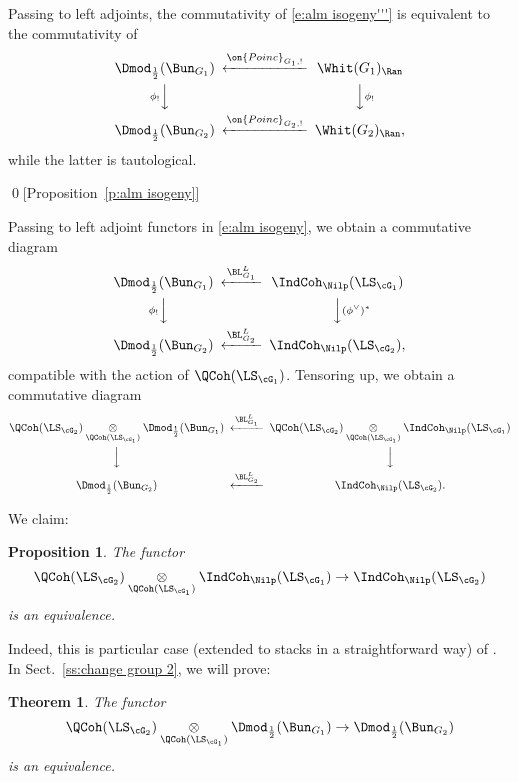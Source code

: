 \documentclass[9pt]{amsart}
\newtheorem{prop}[subsubsection]{Proposition}
\newtheorem{thm}[subsubsection]{Theorem}
\theoremstyle{remark}
\theoremstyle{definition}
\theoremstyle{remark}
\newcommand{\secref}[1]{Sect.~\ref{#1}}
\newcommand{\propref}[1]{Proposition~\ref{#1}}
\numberwithin{equation}{section}
\begin{document}
\sssec{}

Passing to left adjoints, the commutativity of \eqref{e:alm isogeny'''} is equivalent to the 
commutativity of 
$$
\CD
\Dmod_{\frac{1}{2}}(\Bun_{G_1})  @<{\on{Poinc}_{G_1,!}}<< \Whit(G_1)_\Ran \\
@V{\phi_!}VV @VV{\phi_!}V \\
\Dmod_{\frac{1}{2}}(\Bun_{G_2})  @<{\on{Poinc}_{G_2,!}}<< \Whit(G_2)_\Ran, \\
\endCD
$$
while the latter is tautological. 

\qed[\propref{p:alm isogeny}]


\sssec{}

Passing to left adjoint functors in \eqref{e:alm isogeny}, we obtain a commutative diagram
$$
\CD
\Dmod_{\frac{1}{2}}(\Bun_{G_1}) @<{\BL^L_{G_1}}<< \IndCoh_\Nilp(\LS_{\cG_1}) \\
@V{\phi_!}VV  @VV{(\phi^\vee)^*}V \\
\Dmod_{\frac{1}{2}}(\Bun_{G_2}) @<{\BL^L_{G_2}}<< \IndCoh_\Nilp(\LS_{\cG_2}),
\endCD
$$
compatible with the action of $\QCoh(\LS_{\cG_1})$. Tensoring up, we obtain a commutative diagram
\begin{equation} \label{e:alm isogeny ten}
\CD
\QCoh(\LS_{\cG_2})\underset{\QCoh(\LS_{\cG_1})}\otimes 
\Dmod_{\frac{1}{2}}(\Bun_{G_1}) @<{\BL^L_{G_1}}<< \QCoh(\LS_{\cG_2})\underset{\QCoh(\LS_{\cG_1})}\otimes  \IndCoh_\Nilp(\LS_{\cG_1}) \\
@VVV  @VVV \\
\Dmod_{\frac{1}{2}}(\Bun_{G_2}) @<{\BL^L_{G_2}}<< \IndCoh_\Nilp(\LS_{\cG_2}).
\endCD
\end{equation}

\sssec{}

We claim: 
\begin{prop} \label{p:change group 1}
The functor
$$\QCoh(\LS_{\cG_2})\underset{\QCoh(\LS_{\cG_1})}\otimes  \IndCoh_\Nilp(\LS_{\cG_1})\to \IndCoh_\Nilp(\LS_{\cG_2})$$
is an equivalence.
\end{prop} 

Indeed, this is particular case (extended to stacks in a straightforward way) of \cite[Corollary 7.6.2]{AG}. In \secref{ss:change group 2}, we will prove:
\begin{thm} \label{t:change group 2}
The functor
\begin{equation} \label{e:change group 2}
\QCoh(\LS_{\cG_2})\underset{\QCoh(\LS_{\cG_1})}\otimes  \Dmod_{\frac{1}{2}}(\Bun_{G_1})  \to \Dmod_{\frac{1}{2}}(\Bun_{G_2})
\end{equation}
is an equivalence.
\end{thm} 
\end{document}
